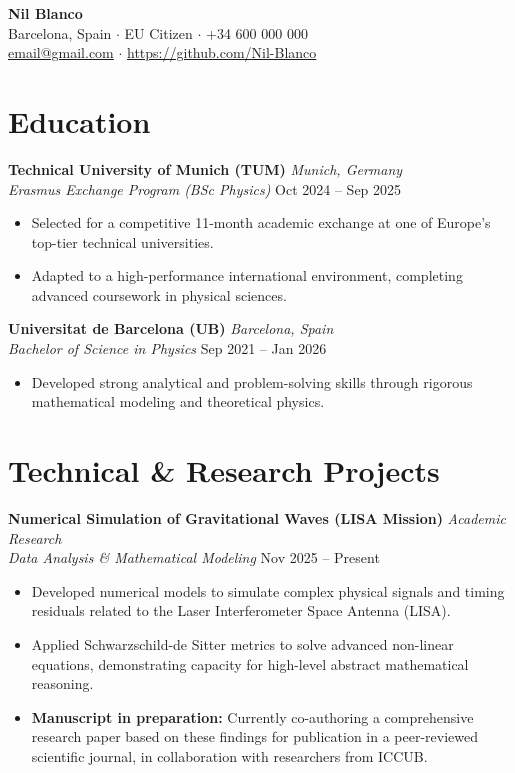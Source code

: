 \documentclass[11pt,a4paper]{article}
\newcommand{\cventry}[4]{
    \noindent \textbf{#1} \hfill \textit{#2} \\
    \noindent \textit{#3} \hfill #4 \vspace{3pt}
}
\begin{document}
\pagestyle{empty}


\begin{center}
    {\Huge \textbf{Nil Blanco}}\\[6pt]
    Barcelona, Spain $\cdot$ EU Citizen $\cdot$ +34 600 000 000 \\
    \href{mailto:email@gmail.com}{email@gmail.com} $\cdot$ \href{https://github.com/Nil-Blanco}{https://github.com/Nil-Blanco}
\end{center}

\vspace{6pt}


\section{Education}

\cventry{Technical University of Munich (TUM)}{Munich, Germany}{Erasmus Exchange Program (BSc Physics)}{Oct 2024 -- Sep 2025}
\begin{itemize}[leftmargin=*, nosep]
    \item Selected for a competitive 11-month academic exchange at one of Europe's top-tier technical universities.
    \item Adapted to a high-performance international environment, completing advanced coursework in physical sciences.
\end{itemize}
\vspace{6pt}

\cventry{Universitat de Barcelona (UB)}{Barcelona, Spain}{Bachelor of Science in Physics}{Sep 2021 -- Jan 2026}
\begin{itemize}[leftmargin=*, nosep]
    \item Developed strong analytical and problem-solving skills through rigorous mathematical modeling and theoretical physics.
\end{itemize}


\section{Technical \& Research Projects}

\cventry{Numerical Simulation of Gravitational Waves (LISA Mission)}{Academic Research}{Data Analysis \& Mathematical Modeling}{Nov 2025 -- Present}
\begin{itemize}[leftmargin=*, nosep]
    \item Developed numerical models to simulate complex physical signals and timing residuals related to the Laser Interferometer Space Antenna (LISA).
    \item Applied Schwarzschild-de Sitter metrics to solve advanced non-linear equations, demonstrating capacity for high-level abstract mathematical reasoning.
    \item \textbf{Manuscript in preparation:} Currently co-authoring a comprehensive research paper based on these findings for publication in a peer-reviewed scientific journal, in collaboration with researchers from ICCUB.
\end{itemize}
\vspace{6pt}
\end{document}
